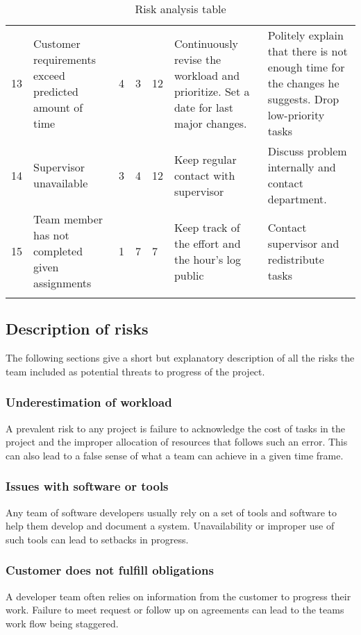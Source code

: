 \begin{longtable}{|p{0.5cm}!{\vrule width -1pt}p{3.6cm}!{\vrule width -1pt}l!{\vrule width -1pt}l!{\vrule width -1pt}l!{\vrule width -1pt}p{4.4cm}!{\vrule width -1pt}p{4.4cm}|}
13&Customer requirements exceed predicted amount of time& 4 & 3 & 12 & Continuously revise the workload and prioritize. Set a date for last major changes. & Politely explain that there is not enough time for the changes he suggests. Drop low-priority tasks\\
14&Supervisor unavailable & 3 & 4 & 12 & Keep regular contact with supervisor & Discuss problem internally and contact department.\\
15&Team member has not completed given assignments & 1 & 7 & 7 & Keep track of the effort and the hour's log public & Contact supervisor and redistribute tasks \\\hline
\caption{Risk analysis table}
\end{longtable}

\subsection{Description of risks}
The following sections give a short but explanatory description of all the risks the team included as potential threats to progress of the project.

\subsubsection{Underestimation of workload}
A prevalent risk to any project is failure to acknowledge the cost of tasks in the project and the improper allocation of resources that follows such an error. This can also lead to a false sense of what a team can achieve in a given time frame.

\subsubsection{Issues with software or tools}
Any team of software developers usually rely on a set of tools and software to help them develop and document a system. Unavailability or improper use of such tools can lead to setbacks in progress.

\subsubsection{Customer does not fulfill obligations}
A developer team often relies on information from the customer to progress their work. Failure to meet request or follow up on agreements can lead to the teams work flow being staggered.

